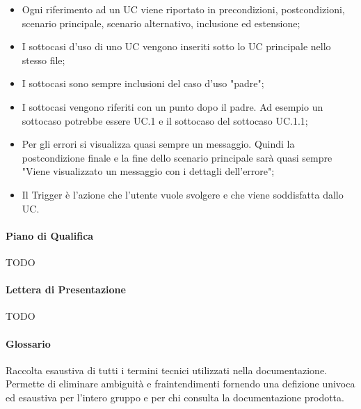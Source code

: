 \begin{itemize}
  \item Ogni riferimento ad un UC viene riportato in precondizioni, postcondizioni, scenario principale, scenario alternativo, inclusione ed estensione;
  \item I sottocasi d'uso di uno UC vengono inseriti sotto lo UC principale nello stesso file;
  \item I sottocasi sono sempre inclusioni del caso d'uso "padre";
  \item I sottocasi vengono riferiti con un punto dopo il padre. Ad esempio un sottocaso potrebbe essere UC.1 e il sottocaso del sottocaso UC.1.1;
  \item Per gli errori si visualizza quasi sempre un messaggio. Quindi la postcondizione finale e la fine dello scenario principale sarà quasi sempre "Viene visualizzato un messaggio con i dettagli dell'errore";
  \item Il Trigger è l'azione che l'utente vuole svolgere e che viene soddisfatta dallo UC.
\end{itemize}

\paragraph{Piano di Qualifica}
TODO

\paragraph{Lettera di Presentazione}
TODO

\paragraph{Glossario}
Raccolta esaustiva di tutti i termini tecnici utilizzati nella documentazione. Permette di eliminare ambiguità e fraintendimenti fornendo una defizione univoca ed esaustiva per l'intero gruppo e per chi consulta la documentazione prodotta.

